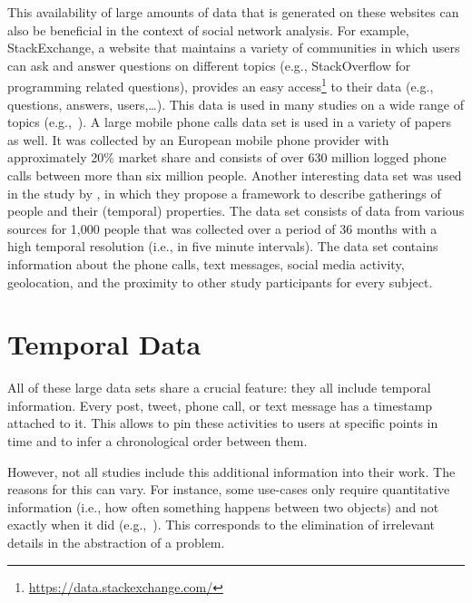 This availability of large amounts of data that is generated on these websites can also be beneficial in the context of social network analysis.
For example, StackExchange, a website that maintains a variety of communities in which users can ask and answer questions on different topics (e.g., StackOverflow for programming related questions), provides an easy access\footnote{\url{https://data.stackexchange.com/}} to their data (e.g., questions, answers, users,\ldots).
This data is used in many studies on a wide range of topics (e.g.,~\cite{Danescu2013,Walk2016, Hasani-Mavriqi2016}).
A large mobile phone calls data set is used in a variety of papers~\cite{Onnela2007, Karsai2014, Murase2015, Laurent2015} as well.
It was collected by an European mobile phone provider with approximately 20\% market share and consists of over 630 million logged phone calls between more than six million people.
Another interesting data set was used in the study by \citet{Sekara2016}, in which they propose a framework to describe gatherings of people and their (temporal) properties.
The data set consists of data from various sources for 1,000 people that was collected over a period of 36 months with a high temporal resolution (i.e., in five minute intervals).
The data set contains information about the phone calls, text messages, social media activity, geolocation, and the proximity to other study participants for every subject.




\section{Temporal Data}
\label{sec:temporal-data}

All of these large data sets share a crucial feature: they all include temporal information.
Every post, tweet, phone call, or text message has a timestamp attached to it.
This allows to pin these activities to users at specific points in time and to infer a chronological order between them.

However, not all studies include this additional information into their work.
The reasons for this can vary.
For instance, some use-cases only require quantitative information (i.e., how often something happens between two objects) and not exactly when it did  (e.g.,~\cite{Kumpula2007, Bagler2008}).
This corresponds to the elimination of irrelevant details in the abstraction of a problem.

